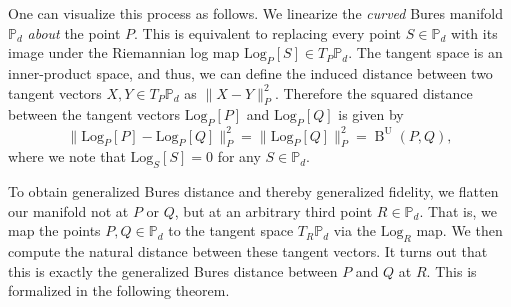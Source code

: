 \documentclass[12pt]{article}
\theoremstyle{definition}
\def \Log {\mathrm{Log}}
\begin{document}
One can visualize this process as follows. We linearize the \textit{curved} Bures manifold $\mathbb P_d$ \textit{about} the point $P$. This is equivalent to replacing every point $S \in \mathbb P_d$ with its image under the Riemannian log map $\Log_P[S] \in T_P \mathbb P_d$. The tangent space is an inner-product space, and thus, we can define the induced distance between two tangent vectors $X, Y \in T_P \mathbb P_d$ as $\|X - Y\|_P^2$. Therefore the squared distance between the tangent vectors $\Log_P[P]$ and $\Log_P[Q]$ is given by
\begin{equation}
     \|\Log_P[P] - \Log_P[Q]\|_P^2 = \|\Log_P[Q]\|_P^2 = \operatorname{B}^\mathrm{U}(P,Q),
\end{equation}
where we note that $\Log_S[S] = 0$ for any $S \in \mathbb P_d$. 

To obtain generalized Bures distance and thereby generalized fidelity, we flatten our manifold not at $P$ or $Q$, but at an arbitrary third point $R \in \mathbb P_d$. That is, we map the points $P,Q \in \mathbb P_d$ to the tangent space $T_R \mathbb P_d$ via the $\Log_R$ map. We then compute the natural distance between these tangent vectors. It turns out that this is exactly the generalized Bures distance between $P$ and $Q$ at $R$. This is formalized in the following theorem. 
\end{document}
